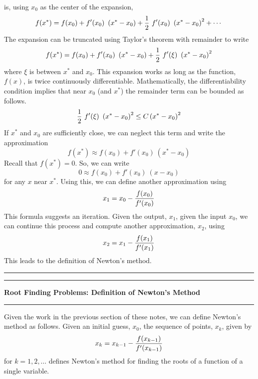 \documentclass[10pt,fleqn]{article}
\begin{document}
is, using $x_0$ as the center of the expansion, 
$$
  f(x^*) = f(x_0) + f'(x_0)\ \left( x^* - x_0 \right)
                  + {1\over 2}\ f'(x_0)\ \left( x^* - x_0 \right)^2 + \cdots
$$
The expansion can be truncated using Taylor's theorem with remainder to write
$$
  f(x^*) = f(x_0) + f'(x_0)\ \left( x^* - x_0 \right)
                  + {1\over 2}\ f'(\xi)\ \left( x^* - x_0 \right)^2
$$
where $\xi$ is between $x^*$ and $x_0$. This expansion works as long as the
function, $f(x)$, is twice continuously differentiable. Mathematically, the
differentiability condition implies that near $x_0$ (and $x^*$) the remainder
term can be bounded as follows.
$$
  {1\over 2}\ f'(\xi)\ \left( x^* - x_0 \right)^2 \leq
                                         C \left( x^* - x_0 \right)^2
$$
If $x^*$ and $x_0$ are sufficiently close, we can neglect this term and write
the approximation
$$
  f(x^*) \approx f(x_0) + f'(x_0)\ \left( x^* - x_0 \right)
$$
Recall that $f(x^*)=0$. So, we can write
$$
  0 \approx f(x_0) + f'(x_0)\ \left( x - x_0 \right)
$$
for any $x$ near $x^*$. Using this, we can define another approximation using
$$
  x_1 = x_0 - {{f(x_0)}\over{f'(x_0)}}
$$
This formula suggests an iteration. Given the output, $x_1$, given the input
$x_0$, we can continue this process and compute another approximation, $x_2$,
using
$$
  x_2 = x_1 - {{f(x_1)}\over{f'(x_1)}}
$$
This leads to the definition of Newton's method.
\vskip0.1in\hrule\vskip0.1in
\newpage
\vskip0.1in\hrule\vskip0.1in
\noindent
{\bf Root Finding Problems: Definition of Newton's Method}
\vskip0.1in\hrule\vskip0.1in
\noindent
Given the work in the previous section of these notes, we can define Newton's
method as follows. Given an initial guess, $x_0$, the sequence of points,
$x_k$, given by
$$
  x_k = x_{k-1} - {{f(x_{k-1})}\over{f'(x_{k-1})}}
$$
for $k=1,2,\ldots$ defines Newton's method for finding the roots of a function
of a single variable.
\end{document}
